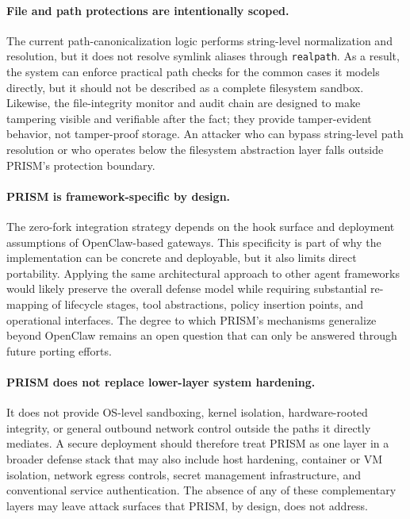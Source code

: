 \paragraph{File and path protections are intentionally scoped.} The current path-canonicalization logic performs string-level normalization and resolution, but it does not resolve symlink aliases through \texttt{realpath}. As a result, the system can enforce practical path checks for the common cases it models directly, but it should not be described as a complete filesystem sandbox. Likewise, the file-integrity monitor and audit chain are designed to make tampering visible and verifiable after the fact; they provide tamper-evident behavior, not tamper-proof storage. An attacker who can bypass string-level path resolution or who operates below the filesystem abstraction layer falls outside PRISM's protection boundary.

\paragraph{PRISM is framework-specific by design.} The zero-fork integration strategy depends on the hook surface and deployment assumptions of OpenClaw-based gateways. This specificity is part of why the implementation can be concrete and deployable, but it also limits direct portability. Applying the same architectural approach to other agent frameworks would likely preserve the overall defense model while requiring substantial re-mapping of lifecycle stages, tool abstractions, policy insertion points, and operational interfaces. The degree to which PRISM's mechanisms generalize beyond OpenClaw remains an open question that can only be answered through future porting efforts.

\paragraph{PRISM does not replace lower-layer system hardening.} It does not provide OS-level sandboxing, kernel isolation, hardware-rooted integrity, or general outbound network control outside the paths it directly mediates. A secure deployment should therefore treat PRISM as one layer in a broader defense stack that may also include host hardening, container or VM isolation, network egress controls, secret management infrastructure, and conventional service authentication. The absence of any of these complementary layers may leave attack surfaces that PRISM, by design, does not address.

